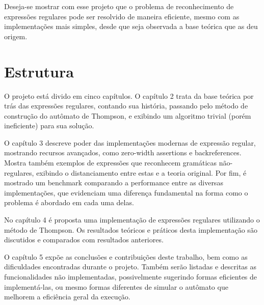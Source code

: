 \documentclass[a4paper,12pt,oneside,onecolumn]{uerj}
\begin{document}
Deseja-se mostrar com esse projeto que o problema de reconhecimento de expressões regulares pode ser resolvido de maneira eficiente, mesmo com as implementações mais simples, desde que seja observada a base teórica que as deu origem.

\section{Estrutura}

O projeto está divido em cinco capítulos. O capítulo 2 trata da base teórica por trás das expressões regulares, contando sua história, passando pelo método de construção do autômato de Thompson, e exibindo um algoritmo trivial (porém ineficiente) para sua solução.

O capítulo 3 descreve poder das implementações modernas de expressão regular, mostrando recursos avançados, como zero-width assertions e backreferences. Mostra também exemplos de expressões que reconhecem gramáticas não-regulares, exibindo o distanciamento entre estas e a teoria original. Por fim, é mostrado um benchmark comparando a performance entre as diversas implementações, que evidenciam uma diferença fundamental na forma como o problema é abordado em cada uma delas.

No capítulo 4 é proposta uma implementação de expressões regulares utilizando o método de Thompson. Os resultados teóricos e práticos desta implementação são discutidos e comparados com resultados anteriores.

O capítulo 5 expõe as conclusões e contribuições deste trabalho, bem como as dificuldades encontradas durante o projeto. Também serão listadas e descritas as funcionalidades não implementadas, possivelmente sugerindo formas eficientes de implementá-las, ou mesmo formas diferentes de simular o autômato que melhorem a eficiência geral da execução.


\backmatter

\printindex
\end{document}
